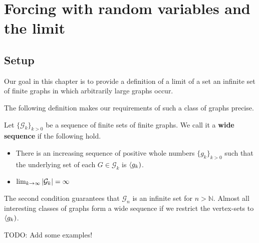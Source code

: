 \chapter{Forcing with random variables and the limit}
\section{Setup}

Our goal in this chapter is to provide a definition of a limit of a set an infinite set of finite graphs in which arbitrarily large graphs occur.

The following definition makes our requirements of such a class of graphs precise.

\begin{defi}
Let $\{\mathcal{G}_k\}_{k>0}$ be a sequence of finite sets of finite graphs. We call it a \textbf{wide sequence} if the following hold.

\begin{itemize}
\item There is an increasing sequence of positive whole numbers $\{g_k\}_{k>0}$ such that the underlying set of each $G\in\mathcal{G}_k$ is $\langle g_k)$.
\item $\lim_{k\to\infty} \left|{\mathcal{G}_k}\right|=\infty$
\end{itemize}
\end{defi}

The second condition guarantees that $\mathcal{G}_n$ is an infinite set for $n>\mathbb{N}$. Almost all interesting classes of graphs form a wide sequence if we restrict the vertex-sets to $\langle g_k)$. 

\begin{exam}
TODO: Add some examples!
\end{exam}

\begin{thrm}
\end{thrm}

